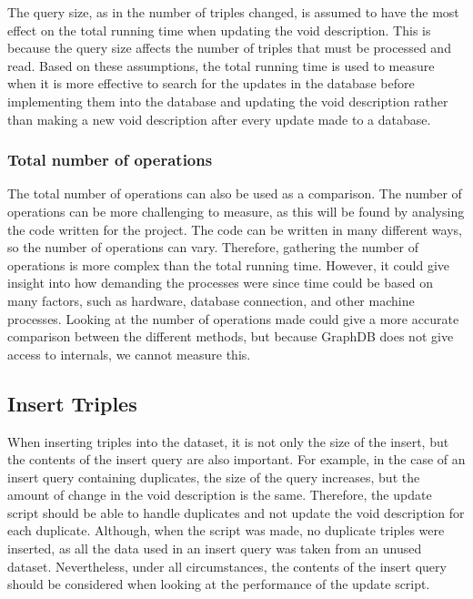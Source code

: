 The query size, as in the number of triples changed, is assumed to have the most effect on the total running time when updating the \gls{void} description. This is because the query size affects the number of triples that must be processed and read. Based on these assumptions, the total running time is used to measure when it is more effective to search for the updates in the database before implementing them into the database and updating the \gls{void} description rather than making a new \gls{void} description after every update made to a database.

\subsubsection{Total number of operations}
The total number of operations can also be used as a comparison.
The number of operations can be more challenging to measure, as this will be found by analysing the code written for the project. The code can be written in many different ways, so the number of operations can vary. Therefore, gathering the number of operations is more complex than the total running time. However, it could give insight into how demanding the processes were since time could be based on many factors, such as hardware, database connection, and other machine processes. Looking at the number of operations made could give a more accurate comparison between the different methods, but because GraphDB does not give access to internals, we cannot measure this.


\subsection{Insert Triples}\label{sec:insert-triples}
When inserting triples into the dataset, it is not only the size of the insert, but the contents of the insert query are also important. For example, in the case of an insert query containing duplicates, the size of the query increases, but the amount of change in the \gls{void} description is the same. Therefore, the update script should be able to handle duplicates and not update the \gls{void} description for each duplicate. Although, when the script was made, no duplicate triples were inserted, as all the data used in an insert query was taken from an unused dataset. Nevertheless, under all circumstances, the contents of the insert query should be considered when looking at the performance of the update script.




